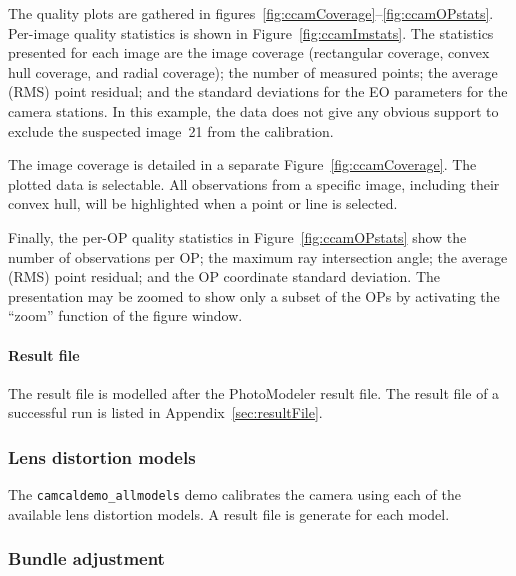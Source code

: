\documentclass{article}
\begin{document}
The quality plots are gathered in
figures~\ref{fig:ccamCoverage}--\ref{fig:ccamOPstats}. Per-image quality
statistics is shown in Figure~\ref{fig:ccamImstats}. The statistics
presented for each image are the image coverage (rectangular coverage,
convex hull coverage, and radial coverage); the number of measured
points; the average (RMS) point residual; and the standard deviations
for the EO parameters for the camera stations. In this example, the
data does not give any obvious support to exclude the suspected
image~21 from the calibration.

The image coverage is detailed in a separate
Figure~\ref{fig:ccamCoverage}. The plotted data is selectable. All
observations from a specific image, including their convex hull, will
be highlighted when a point or line is selected.

Finally, the per-OP quality statistics in Figure~\ref{fig:ccamOPstats}
show the number of observations per OP; the maximum ray intersection
angle; the average (RMS) point residual; and the OP coordinate
standard deviation. The presentation may be zoomed to show only a
subset of the OPs by activating the ``zoom'' function of the figure
window.

\paragraph{Result file}
\label{sec:orgcf96947}

The result file is modelled after the PhotoModeler result file. The
result file of a successful run is listed in
Appendix~\ref{sec:resultFile}.

\subsubsection{Lens distortion models}
\label{sec:org1aa759b}

The \texttt{camcaldemo\_allmodels} demo calibrates the camera using
each of the available lens distortion models. A result file is
generate for each model.

\subsubsection{Bundle adjustment}
\label{sec:org23adab5}
\end{document}
